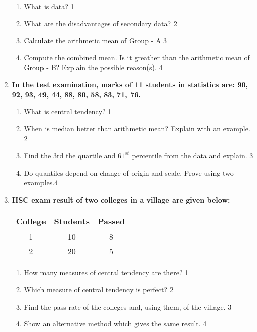 \documentclass[a4paper,oneside]{book}
\begin{document}
\begin{enumerate}
  \begin{enumerate}
    \item
	What is data? \hfill 1
    \item
	What are the disadvantages of secondary data? \hfill 2
    \item  
	Calculate the arithmetic mean of Group - A \hfill 3
    \item
	Compute the combined mean. Is it greather than the arithmetic mean of Group - B? Explain the possible reason(s). \hfill 4
\end{enumerate}


    \item
  \textbf{In the test examination, marks of 11 students in statistics are: 90, 92, 93, 49, 44, 88, 80, 58, 83, 71, 76.}
  \begin{enumerate}
    \item
	What is central tendency? \hfill 1
    \item
	When is median better than arithmetic mean? Explain with an example. \hfill 2
    \item  
	Find the 3rd the quartile and $61^{st}$ percentile from the data and explain.  \hfill 3
    \item
	Do quantiles depend on change of origin and scale. Prove using two examples.\hfill 4
\end{enumerate}

 \item
	  \textbf{HSC exam result of two colleges in a village are given below:} 
	  
	  \begin{table}[h]
	  \centering
\begin{tabular}{c|c|c}
College & Students & Passed \\ \hline
1 & 10 & 8 \\ \hline
2 & 20 & 5
\end{tabular}
\end{table}
  
  \begin{enumerate}
    \item
	How many measures of central tendency are there? \hfill 1
    \item
	Which measure of central tendency is perfect? \hfill 2
    \item  
	Find the pass rate of the colleges and, using them, of the village. \hfill 3
    \item
	Show an alternative method which gives the same result. \hfill 4
  \end{enumerate}


\end{enumerate}
\end{document}
